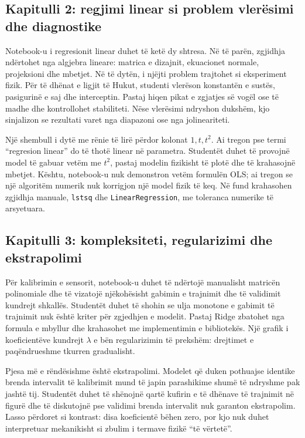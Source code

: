 \documentclass[12pt,a4paper,oneside]{book}
\begin{document}
\subsection*{Kapitulli 2: regjimi linear si problem vlerësimi dhe diagnostike}
Notebook-u i regresionit linear duhet të ketë dy shtresa. Në të parën, zgjidhja ndërtohet nga algjebra lineare: matrica e dizajnit, ekuacionet normale, projeksioni dhe mbetjet. Në të dytën, i njëjti problem trajtohet si eksperiment fizik. Për të dhënat e ligjit të Hukut, studenti vlerëson konstantën e sustës, pasigurinë e saj dhe interceptin. Pastaj hiqen pikat e zgjatjes së vogël ose të madhe dhe kontrollohet stabiliteti. Nëse vlerësimi ndryshon dukshëm, kjo sinjalizon se rezultati varet nga diapazoni ose nga jolineariteti.

Një shembull i dytë me rënie të lirë përdor kolonat $1,t,t^2$. Ai tregon pse termi “regresion linear” do të thotë linear në parametra. Studentët duhet të provojnë model të gabuar vetëm me $t^2$, pastaj modelin fizikisht të plotë dhe të krahasojnë mbetjet. Kështu, notebook-u nuk demonstron vetëm formulën OLS; ai tregon se një algoritëm numerik nuk korrigjon një model fizik të keq. Në fund krahasohen zgjidhja manuale, \texttt{lstsq} dhe \texttt{LinearRegression}, me toleranca numerike të arsyetuara.

\subsection*{Kapitulli 3: kompleksiteti, regularizimi dhe ekstrapolimi}
Për kalibrimin e sensorit, notebook-u duhet të ndërtojë manualisht matricën polinomiale dhe të vizatojë njëkohësisht gabimin e trajnimit dhe të validimit kundrejt shkallës. Studentët duhet të shohin se ulja monotone e gabimit të trajnimit nuk është kriter për zgjedhjen e modelit. Pastaj Ridge zbatohet nga formula e mbyllur dhe krahasohet me implementimin e bibliotekës. Një grafik i koeficientëve kundrejt $\lambda$ e bën regularizimin të prekshëm: drejtimet e paqëndrueshme tkurren gradualisht.

Pjesa më e rëndësishme është ekstrapolimi. Modelet që duken pothuajse identike brenda intervalit të kalibrimit mund të japin parashikime shumë të ndryshme pak jashtë tij. Studentët duhet të shënojnë qartë kufirin e të dhënave të trajnimit në figurë dhe të diskutojnë pse validimi brenda intervalit nuk garanton ekstrapolim. Lasso përdoret si kontrast: disa koeficientë bëhen zero, por kjo nuk duhet interpretuar mekanikisht si zbulim i termave fizikë “të vërtetë”.
\end{document}
